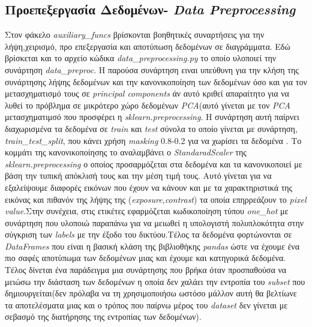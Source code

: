 \documentclass[10pt,a4paper,]{article}
\begin{document}
\subsection{Προεπεξεργασία Δεδομένων- \textit{Data Preprocessing}}
Στον φάκελο \textit{auxiliary\_funcs} βρίσκονται βοηθητικές συναρτήσεις για την λήψη,χειρισμό,
προ επεξεργασία και αποτύπωση δεδομένων σε διαγράμματα. Εδώ βρίσκεται και το αρχείο κώδικα \textit{data\_preprocessing.py} το οποίο υλοποιεί την συνάρτηση \textit{data\_preproc}. Η παρούσα συνάρτηση ειναι υπεύθυνη για την κλήση της συνάρτησης λήψης δεδομένων και την κανονικοποίηση των δεδομένων όσο και για τον μετασχηματισμό τους σε \textit{principal components} άν αυτό κριθεί απαραίτητο για να λυθεί το πρόβλημα σε μικρότερο χώρο δεδομένων \textit{PCA}(αυτό  γίνεται με τον \textit{PCA} μετασχηματιμσό που προσφέρει η \textit{sklearn.preprocessing}. Η συνάρτηση αυτή παίρνει διαχωρισμένα τα δεδομένα σε \textit{train} και \textit{test} σύνολα το οποίο γίνεται με συνάρτηση, \textit{train\_test\_split}, που κάνει χρήση \textit{masking} 0.8-0.2 για να χωρίσει τα δεδομένα . Το κομμάτι της κανονικοποίησης το αναλαμβάνει ο \textit{StandaradScaler} της \textit{sklearn.preprocessing} ο οποίος προσαρμόζεται στα δεδομένα και τα κανονικοποιεί με βάση την τυπική απόκλισή τους και την μέση τιμή τους. Αυτό γίνεται για να εξαλείψουμε διαφορές εικόνων που έχουν να κάνουν και με τα χαρακτηριστικά της εικόνας και πιθανόν της λήψης της (\textit{exposure,contrast}) τα οποία επηρρεάζουν το \textit{pixel value}.Στην συνέχεια, στις ετικέτες εφαρμόζεται κωδικοποίηση τύπου \textit{one\_hot} με συνάρτηση που υλοποιώ παραπάνω για να μειωθεί η υπολογιστή πολυπλοκότητα στην σύγκριση των \textit{labels} με την έξοδο του δικτύου.Τέλος τα δεδομένα φορτώνονται σε \textit{DataFrames} που είναι η βασική κλάση της βιβλιοθήκης \textit{pandas} ώστε να έχουμε ένα πιο σαφές αποτύπωμα των δεδομένων μιας και έχουμε και κατηγορικά δεδομένα. Τέλος δίνεται ένα παράδειγμα μια συνάρτησης που βρήκα όταν προσπαθούσα να μειώσω την διάσταση των δεδομένων η οποία δεν χαλάει την εντροπία του \textit{subset} που δημιουργείται(δεν πρόλαβα να τη χρησιμοποιήσω ωστόσο μάλλον αυτή θα βελτίωνε τα αποτελέσματα μιας και ο τρόπος που παίρνω μέρος του \textit{dataset} δεν γίνεται με σεβασμό της διατήρησης της εντροπίας των δεδομένων).
\end{document}
